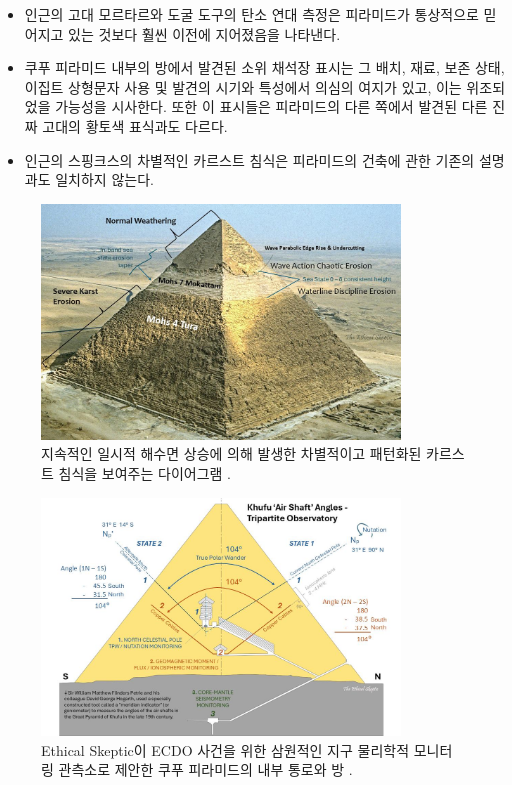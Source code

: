 \documentclass[10pt,twocolumn,letterpaper]{article}
\begin{document}
\begin{flushleft}
\begin{itemize}
    \item 인근의  고대 모르타르와 도굴 도구의 탄소 연대 측정은 피라미드가 통상적으로 믿어지고 있는 것보다 훨씬 이전에 지어졌음을 나타낸다.
    \item 쿠푸 피라미드 내부의 방에서 발견된 소위 채석장 표시는 그 배치, 재료, 보존 상태, 이집트 상형문자 사용 및 발견의 시기와 특성에서 의심의 여지가 있고, 이는 위조되었을 가능성을 시사한다. 또한 이 표시들은 피라미드의 다른 
    쪽에서 발견된 다른 진짜 고대의 황토색 표식과도 다르다.
    \item 인근의 스핑크스의 차별적인 카르스트 침식은 피라미드의  건축에 관한  기존의 설명과도 일치하지 않는다.
\end{itemize}
\end{flushleft}

\begin{figure}[t]
\begin{center}
\includegraphics[width=0.85\textwidth]{khafre.jpg}
\end{center}
   \caption{지속적인 일시적 해수면 상승에 의해 발생한 차별적이고 패턴화된 카르스트 침식을 보여주는 다이어그램 \cite{27}.}
\label{fig:4}
\end{figure}

\begin{figure}[t]
\begin{center}
\includegraphics[width=0.85\textwidth]{shafts.jpg}
\end{center}
   \caption{Ethical Skeptic이 ECDO 사건을 위한 삼원적인 지구 물리학적 모니터링 관측소로 제안한 쿠푸 피라미드의 내부 통로와 방 \cite{28}.}
\label{fig:5}
\end{figure}
\end{document}
